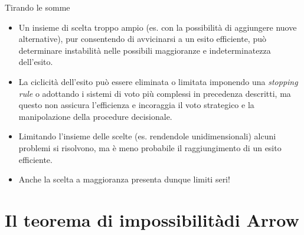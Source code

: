 \documentclass[aspectratio=64,12pt]{beamer}
\begin{document}
\begin{frame}{Tirando le somme}
\begin{itemize}
\item Un insieme di scelta troppo ampio (es. con la possibilità di aggiungere
nuove alternative), pur consentendo di avvicinarsi a un esito efficiente,
può determinare instabilità nelle possibili maggioranze e indeterminatezza
dell'esito.
\item La ciclicità dell'esito può essere eliminata o limitata imponendo una
\emph{stopping rule} o adottando i sistemi di voto più complessi in precedenza
descritti, ma questo non assicura l'efficienza e incoraggia il voto
strategico e la manipolazione della procedure decisionale.
\item Limitando l'insieme delle scelte (es. rendendole unidimensionali) alcuni
problemi si risolvono, ma è meno probabile il raggiungimento di un
esito efficiente.
\item Anche la scelta a maggioranza presenta dunque limiti seri!
\end{itemize}
\end{frame}

\section{Il teorema di impossibilità\newline di Arrow}
\end{document}

